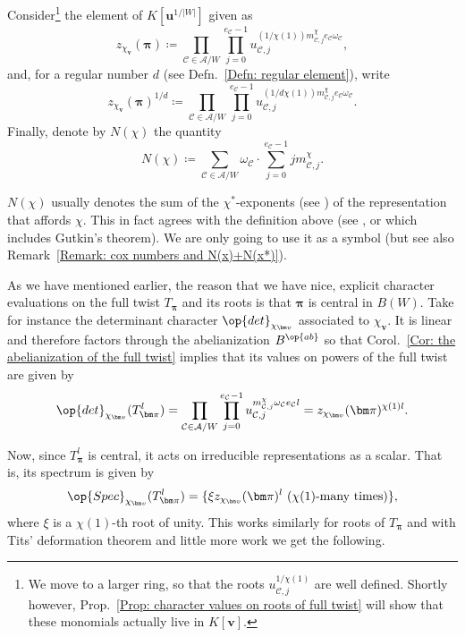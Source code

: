 \begin{defi}\label{Def. Pre character value stuff}
Consider\footnote{We move to a larger ring, so that the roots $u_{\mathcal{C},j}^{1/\chi(1)}$ are well defined. Shortly however, Prop.~\ref{Prop: character values on roots of full twist} will show that these monomials actually live in $K[\bm v]$.} the element of $K[\bm u^{1/|W|}]$ given as $$z_{\chi_{\bm v}}(\bm \pi)\coloneqq \prod_{\mathcal{C}\in\mathcal{A}/W}\prod_{j=0}^{e_{\mathcal{C}}-1}u_{\mathcal{C},j}^{(1/\chi(1))m^{\chi}_{\mathcal{C},j}e_{\mathcal{C}}\omega_{\mathcal{C}}},$$ and, for a regular number $d$ \textup{(}see Defn.~\ref{Defn: regular element}\textup{)}, write $$z_{\chi_{\bm v}}(\bm \pi)^{1/d}\coloneqq \prod_{\mathcal{C}\in\mathcal{A}/W}\prod_{j=0}^{e_{\mathcal{C}}-1}u_{\mathcal{C},j}^{(1/d\chi(1))m^{\chi}_{\mathcal{C},j}e_{\mathcal{C}}\omega_{\mathcal{C}}}.$$
Finally, denote by $N(\chi)$ the quantity $$N(\chi)\coloneqq \sum_{\mathcal{C}\in\mathcal{A}/W}\omega_{\mathcal{C}}\cdot\sum_{j=0}^{e_{\mathcal{C}}-1}jm^{\chi}_{\mathcal{C},j}.$$
\end{defi}

\begin{rema}\label{Remark: N(x) via coexponents}
$N(\chi)$ usually denotes the sum of the $\chi^{*}$-exponents (see \cite[Chapter~4:~\S4]{lehrer-taylor-book}) of the representation that affords $\chi$. This in fact agrees with the definition above (see \cite[Prop.~4.1]{broue-michel-french-paper}, or \cite[Lemma~10.15 and Remark~10.12]{lehrer-taylor-book} which includes Gutkin's theorem). We are only going to use it as a symbol (but see also Remark~\ref{Remark: cox numbers and N(x)+N(x*)}).
\end{rema}

As we have mentioned earlier, the reason that we have nice, explicit character evaluations on the full twist $T_{\bm\pi}$ and its roots is that $\bm\pi$ is central in $B(W)$. Take for instance the determinant character $\op{det}_{\chi_{\bm v}}$ associated to $\chi_{\bm v}$. It is linear and therefore factors through the abelianization $B^{\op{ab}}$ so that Corol.~\ref{Cor: the abelianization of the full twist} implies that its values on powers of the full twist are given by 
\[
\op{det}_{\chi_{\bm v}}(T_{\bm \pi}^l)=\prod_{\mathcal{C}\in\mathcal{A}/W}\prod_{j=0}^{e_{\mathcal{C}}-1}u_{\mathcal{C},j}^{m^{\chi}_{\mathcal{C},j}\omega_{\mathcal{C}}e_{\mathcal{C}}l}=z_{\chi_{\bm v}}(\bm \pi)^{\chi(1)l}.
\]

Now, since $T_{\bm\pi}^l$ is central, it acts on irreducible representations as a scalar. That is, its spectrum is given by $$\op{Spec}_{\chi_{\bm v}}(T_{\bm\pi}^l)=\{\xi z_{\chi_{\bm v}}(\bm\pi)^l\ (\chi(1)\text{-many times})\},$$ where $\xi$ is a $\chi(1)$-th root of unity. This works similarly for roots of $T_{\bm\pi}$ and with Tits' deformation theorem and little more work we get the following.

